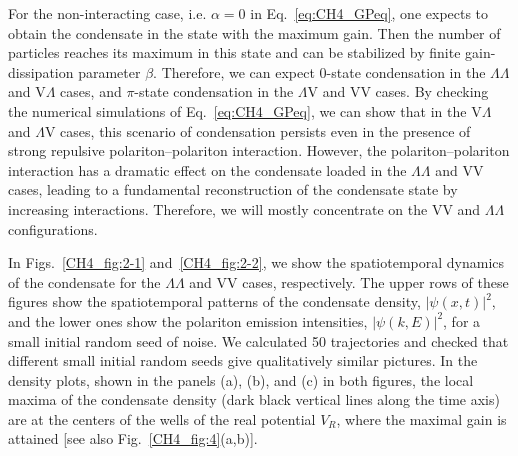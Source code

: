For the non-interacting case, i.e. $\alpha = 0$ in Eq.~\eqref{eq:CH4_GPeq}, one expects to obtain the condensate in the state with the maximum gain.
Then the number of particles reaches its maximum in this state and can be stabilized by finite gain-dissipation parameter $\beta$.
Therefore, we can expect $0$-state condensation in the $\Lambda\Lambda$ and V$\Lambda$ cases, and $\pi$-state condensation in the $\Lambda$V and VV cases.
By checking the numerical simulations of Eq.~\eqref{eq:CH4_GPeq}, we can show that in the V$\Lambda$ and $\Lambda$V cases, this scenario of condensation persists even in the presence of strong repulsive polariton--polariton interaction.
However, the polariton--polariton interaction has a dramatic effect on the condensate loaded in the $\Lambda\Lambda$ and VV cases, leading to a fundamental reconstruction of the condensate state by increasing interactions.
Therefore, we will mostly concentrate on the VV and $\Lambda\Lambda$ configurations.

In Figs.~\ref{CH4_fig:2-1} and~\ref{CH4_fig:2-2}, we show the spatiotemporal dynamics of the condensate for the $\Lambda\Lambda$ and VV cases, respectively.
The upper rows of these figures show the spatiotemporal patterns of the condensate density, $|\psi(x,t)|^2$, and the lower ones show the polariton emission intensities, $|\psi(k,E)|^2$, for a small initial random seed of noise.
We calculated 50 trajectories and checked that different small initial random seeds give qualitatively similar pictures.
In the density plots, shown in the panels (a), (b), and (c) in both figures, the local maxima of the condensate density (dark black vertical lines along the time axis) are at the centers of the wells of the real potential $V_R$, where the maximal gain is attained [see also Fig.~\ref{CH4_fig:4}(a,b)].

